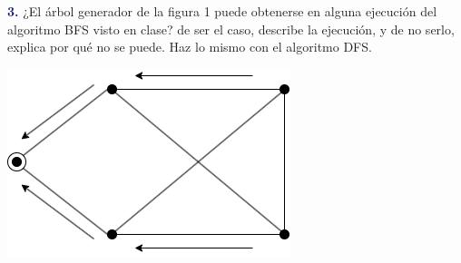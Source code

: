 \newpage
\textbf{\textcolor{MidnightBlue}{3.}}
¿El árbol generador de la figura 1 puede obtenerse en alguna ejecución del algoritmo
BFS visto en clase? de ser el caso, describe la ejecución, y de no serlo, explica por qué no se puede.
Haz lo mismo con el algoritmo DFS.\\

\begin{center}
        \includegraphics[scale=0.7]{grapho.png}
    \end{center}
